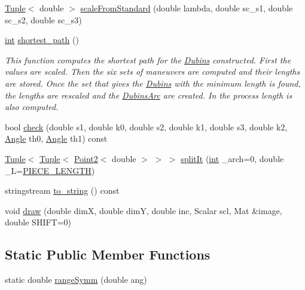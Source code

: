 \begin{DoxyCompactItemize}
\mbox{\hyperlink{class_tuple}{Tuple}}$<$ double $>$ \mbox{\hyperlink{class_dubins_a5f4cd38e551fc0e2abdc360459454344}{scale\+From\+Standard}} (double lambda, double sc\+\_\+s1, double sc\+\_\+s2, double sc\+\_\+s3)
\item 
\mbox{\hyperlink{draw_8hh_aa620a13339ac3a1177c86edc549fda9b}{int}} \mbox{\hyperlink{class_dubins_a52681fe06e50899b5296204a312233ce}{shortest\+\_\+path}} ()
\begin{DoxyCompactList}\small\item\em This function computes the shortest path for the \mbox{\hyperlink{class_dubins}{Dubins}} constructed. First the values are scaled. Then the six sets of maneuvers are computed and their lengths are stored. Once the set that gives the \mbox{\hyperlink{class_dubins}{Dubins}} with the minimum length is found, the lengths are rescaled and the {\ttfamily \mbox{\hyperlink{class_dubins_arc}{Dubins\+Arc}}} are created. In the process length is also computed. \end{DoxyCompactList}\item 
bool \mbox{\hyperlink{class_dubins_ae016db7e7b4c450c0281792608205449}{check}} (double s1, double k0, double s2, double k1, double s3, double k2, \mbox{\hyperlink{class_angle}{Angle}} th0, \mbox{\hyperlink{class_angle}{Angle}} th1) const
\item 
\mbox{\hyperlink{class_tuple}{Tuple}}$<$ \mbox{\hyperlink{class_tuple}{Tuple}}$<$ \mbox{\hyperlink{class_point2}{Point2}}$<$ double $>$ $>$ $>$ \mbox{\hyperlink{class_dubins_a68d6703215b12b2933346efd77563575}{split\+It}} (\mbox{\hyperlink{draw_8hh_aa620a13339ac3a1177c86edc549fda9b}{int}} \+\_\+arch=0, double \+\_\+L=\mbox{\hyperlink{dubins_8hh_a5b2500ca93a5100f73dc442d3cfea7d4}{P\+I\+E\+C\+E\+\_\+\+L\+E\+N\+G\+TH}})
\item 
stringstream \mbox{\hyperlink{class_dubins_a08abdf02352b6d47aafeea1eed9bfbfe}{to\+\_\+string}} () const
\item 
void \mbox{\hyperlink{class_dubins_a7de38680172155f68f71714ae13a212e}{draw}} (double dimX, double dimY, double inc, Scalar scl, Mat \&image, double S\+H\+I\+FT=0)
\end{DoxyCompactItemize}
\subsection*{Static Public Member Functions}
\begin{DoxyCompactItemize}
\item 
static double \mbox{\hyperlink{class_dubins_a1f80a03865231b60841bc8ec7623c04f}{range\+Symm}} (double ang)
\end{DoxyCompactItemize}
